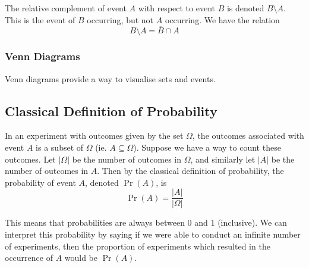 \documentclass[11pt]{report} %
\begin{document}
The relative complement of event $A$ with respect to event $B$ is denoted $B\setminus A$. This is the event of $B$ occurring, but not $A$ occurring. We have the relation
\begin{equation}
B\setminus A = \overline{B}\cap A
\end{equation}

\subsubsection{Venn Diagrams}

Venn diagrams provide a way to visualise sets and events.

\begin{center}
\end{center}


\subsection{Classical Definition of Probability}

In an experiment with outcomes given by the set $\Omega$, the outcomes associated with event $A$ is a subset of $\Omega$ (ie. $A \subseteq \Omega$). Suppose we have a way to count these outcomes. Let $\left|\Omega\right|$ be the number of outcomes in $\Omega$, and similarly let $\left|A\right|$ be the number of outcomes in $A$. Then by the classical definition of probability, the probability of event $A$, denoted $\operatorname{Pr}\left(A\right)$, is
\begin{equation}
\operatorname{Pr}\left(A\right) = \dfrac{\left|A\right|}{\left|\Omega\right|}
\end{equation}

This means that probabilities are always between $0$ and $1$ (inclusive). We can interpret this probability by saying if we were able to conduct an infinite number of experiments, then the proportion of experiments which resulted in the occurrence of $A$ would be $\operatorname{Pr}\left(A\right)$.
\end{document}
